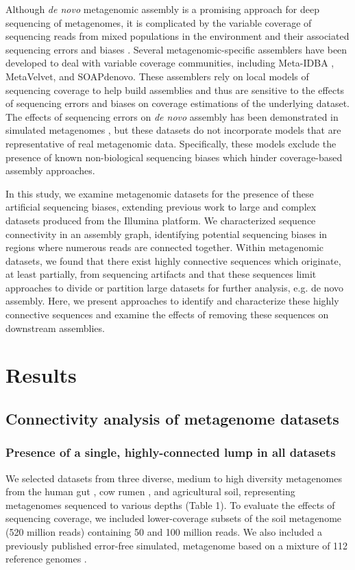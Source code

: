 \documentclass[10pt]{article}
\begin{document}
Although \emph{de novo} metagenomic assembly is a promising approach for deep sequencing of metagenomes, it is complicated by the variable coverage of sequencing reads from mixed populations in the environment and their associated sequencing errors and biases \cite{Mende:2012p1262,Pignatelli:2011p742}. Several metagenomic-specific assemblers have been developed to deal with variable coverage communities, including Meta-IDBA \cite{Peng:2011p898}, MetaVelvet, and SOAPdenovo.  These assemblers rely on local models of sequencing coverage to help build assemblies and thus are sensitive to the effects of sequencing errors and biases on coverage estimations of the underlying dataset. The effects of sequencing errors on \emph{de novo} assembly has been demonstrated in simulated metagenomes \cite{Mavromatis:2006p894,Mende:2012p1262,Pignatelli:2011p742}, but these datasets do not incorporate models that are representative of real metagenomic data.  Specifically, these models exclude the presence of known non-biological sequencing biases \cite{GomezAlvarez:2009p1334,Keegan:2012p1336,Niu:2010p1333} which hinder coverage-based assembly approaches.  

In this study, we examine metagenomic datasets for the presence of these artificial sequencing biases, extending previous work to large and complex datasets produced from the Illumina platform. We characterized sequence connectivity in an assembly graph, identifying potential sequencing biases in regions where numerous reads are connected together.  Within metagenomic datasets, we found that there exist highly connective sequences which originate, at least partially, from sequencing artifacts and that these sequences limit approaches to divide or partition large datasets for further analysis, e.g. {de novo} assembly.  Here, we present approaches to identify and characterize these highly connective sequences and examine the effects of removing these sequences on downstream assemblies.

\section*{Results}

\subsection*{Connectivity analysis of metagenome datasets}

\subsubsection*{Presence of a single, highly-connected lump in all datasets}
We selected datasets from three diverse, medium to high diversity metagenomes from the human gut \cite{Qin:2010p189}, cow rumen \cite{Hess:2011p686}, and agricultural soil, representing metagenomes sequenced to various depths (Table 1).  To evaluate the effects of sequencing coverage, we included lower-coverage subsets of the soil metagenome (520 million reads) containing 50 and 100 million reads.  We also included a previously published error-free simulated, metagenome based on a mixture of 112 reference genomes \cite{Pignatelli:2011p742}.
\end{document}
